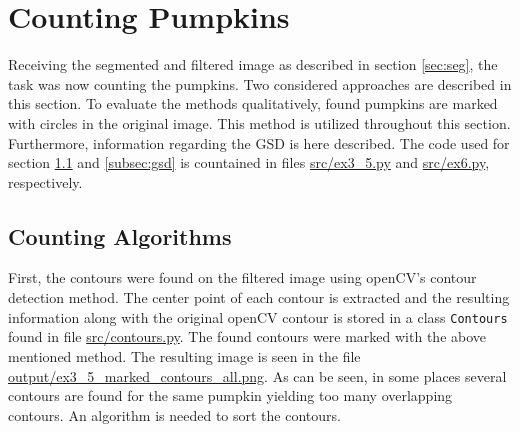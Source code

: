 \documentclass[../Head/Main.tex]{subfiles}
\begin{document}
\section{Counting Pumpkins}\label{sec:counting}
Receiving the segmented and filtered image as described in section \ref{sec:seg}, the task was now counting the pumpkins. Two considered approaches are described in this section. To evaluate the methods qualitatively, found pumpkins are marked with circles in the original image. This method is utilized throughout this section. Furthermore, information regarding the GSD is here described. The code used for section \ref{subsec:algorithms} and \ref{subsec:gsd} is countained in files \url{src/ex3_5.py} and \url{src/ex6.py}, respectively.

\subsection{Counting Algorithms}\label{subsec:algorithms}
First, the contours were found on the filtered image using openCV's contour detection method. The center point of each contour is extracted and the resulting information along with the original openCV contour is stored in a class \verb+Contours+ found in file \url{src/contours.py}. The found contours were marked with the above mentioned method. The resulting image is seen in the file \url{output/ex3_5_marked_contours_all.png}. As can be seen, in some places several contours are found for the same pumpkin yielding too many overlapping contours. An algorithm is needed to sort the contours.
\end{document}
